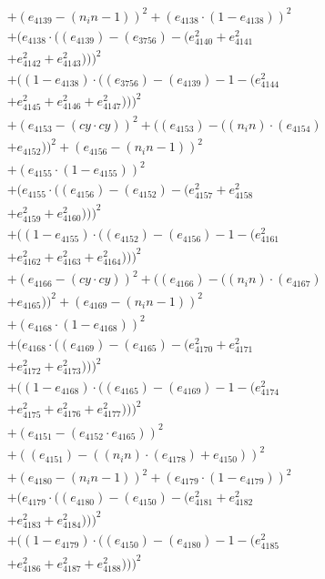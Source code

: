 \documentclass[10pt, a4paper]{article}
\begin{document}
\begin{align*}
& + (e_{4139} - (n_in - 1))^{2} + (e_{4138}  \cdot  (1 - e_{4138}))^{2} \\
& + (e_{4138}  \cdot  ((e_{4139}) - (e_{3756}) - (e_{4140}^{2} + e_{4141}^{2} \\
& + e_{4142}^{2} + e_{4143}^{2})))^{2} \\
& + ((1 - e_{4138})  \cdot  ((e_{3756}) - (e_{4139}) - 1 - (e_{4144}^{2} \\
& + e_{4145}^{2} + e_{4146}^{2} + e_{4147}^{2})))^{2} \\
& + (e_{4153} - (cy  \cdot  cy))^{2} + ((e_{4153}) - ((n_in)  \cdot  (e_{4154}) \\
& + e_{4152}))^{2} + (e_{4156} - (n_in - 1))^{2} \\
& + (e_{4155}  \cdot  (1 - e_{4155}))^{2} \\
& + (e_{4155}  \cdot  ((e_{4156}) - (e_{4152}) - (e_{4157}^{2} + e_{4158}^{2} \\
& + e_{4159}^{2} + e_{4160}^{2})))^{2} \\
& + ((1 - e_{4155})  \cdot  ((e_{4152}) - (e_{4156}) - 1 - (e_{4161}^{2} \\
& + e_{4162}^{2} + e_{4163}^{2} + e_{4164}^{2})))^{2} \\
& + (e_{4166} - (cy  \cdot  cy))^{2} + ((e_{4166}) - ((n_in)  \cdot  (e_{4167}) \\
& + e_{4165}))^{2} + (e_{4169} - (n_in - 1))^{2} \\
& + (e_{4168}  \cdot  (1 - e_{4168}))^{2} \\
& + (e_{4168}  \cdot  ((e_{4169}) - (e_{4165}) - (e_{4170}^{2} + e_{4171}^{2} \\
& + e_{4172}^{2} + e_{4173}^{2})))^{2} \\
& + ((1 - e_{4168})  \cdot  ((e_{4165}) - (e_{4169}) - 1 - (e_{4174}^{2} \\
& + e_{4175}^{2} + e_{4176}^{2} + e_{4177}^{2})))^{2} \\
& + (e_{4151} - (e_{4152}  \cdot  e_{4165}))^{2} \\
& + ((e_{4151}) - ((n_in)  \cdot  (e_{4178}) + e_{4150}))^{2} \\
& + (e_{4180} - (n_in - 1))^{2} + (e_{4179}  \cdot  (1 - e_{4179}))^{2} \\
& + (e_{4179}  \cdot  ((e_{4180}) - (e_{4150}) - (e_{4181}^{2} + e_{4182}^{2} \\
& + e_{4183}^{2} + e_{4184}^{2})))^{2} \\
& + ((1 - e_{4179})  \cdot  ((e_{4150}) - (e_{4180}) - 1 - (e_{4185}^{2} \\
& + e_{4186}^{2} + e_{4187}^{2} + e_{4188}^{2})))^{2} \\

\end{align*}
\end{document}

